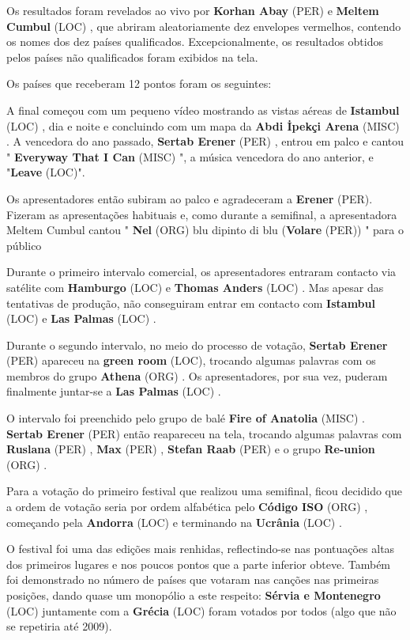 \documentclass[12pt,a4paper]{article}
\begin{document}
Os resultados foram revelados ao vivo por \textbf{Korhan Abay} (PER) e \textbf{Meltem Cumbul} (LOC) , que abriram aleatoriamente dez envelopes vermelhos, contendo os nomes dos dez países qualificados. Excepcionalmente, os resultados obtidos pelos países não qualificados foram exibidos na tela.

Os países que receberam 12 pontos foram os seguintes:

A final começou com um pequeno vídeo mostrando as vistas aéreas de \textbf{Istambul} (LOC) , dia e noite e concluindo com um mapa da \textbf{Abdi İpekçi Arena} (MISC) . A vencedora do ano passado, \textbf{Sertab Erener} (PER) , entrou em palco e cantou " \textbf{Everyway That I Can} (MISC) ", a música vencedora do ano anterior, e "\textbf{Leave} (LOC)".

Os apresentadores então subiram ao palco e agradeceram a \textbf{Erener} (PER). Fizeram as apresentações habituais e, como durante a semifinal, a apresentadora Meltem Cumbul cantou " \textbf{Nel} (ORG) blu dipinto di blu (\textbf{Volare} (PER)) " para o público

Durante o primeiro intervalo comercial, os apresentadores entraram contacto via satélite com \textbf{Hamburgo} (LOC) e \textbf{Thomas Anders} (LOC) . Mas apesar das tentativas de produção, não conseguiram entrar em contacto com \textbf{Istambul} (LOC) e \textbf{Las Palmas} (LOC) .

Durante o segundo intervalo, no meio do processo de votação, \textbf{Sertab Erener} (PER) apareceu na \textbf{green room} (LOC), trocando algumas palavras com os membros do grupo \textbf{Athena} (ORG) . Os apresentadores, por sua vez, puderam finalmente juntar-se a \textbf{Las Palmas} (LOC) .

O intervalo foi preenchido pelo grupo de balé \textbf{Fire of Anatolia} (MISC) . \textbf{Sertab Erener} (PER) então reapareceu na tela, trocando algumas palavras com \textbf{Ruslana} (PER) , \textbf{Max} (PER) , \textbf{Stefan Raab} (PER) e o grupo \textbf{Re-union} (ORG) .

Para a votação do primeiro festival que realizou uma semifinal, ficou decidido que a ordem de votação seria por ordem alfabética pelo \textbf{Código ISO} (ORG) , começando pela \textbf{Andorra} (LOC) e terminando na \textbf{Ucrânia} (LOC) .

O festival foi uma das edições mais renhidas, reflectindo-se nas pontuações altas dos primeiros lugares e nos poucos pontos que a parte inferior obteve. Também foi demonstrado no número de países que votaram nas canções nas primeiras posições, dando quase um monopólio a este respeito: \textbf{Sérvia e Montenegro} (LOC) juntamente com a \textbf{Grécia} (LOC) foram votados por todos (algo que não se repetiria até 2009).
\end{document}
